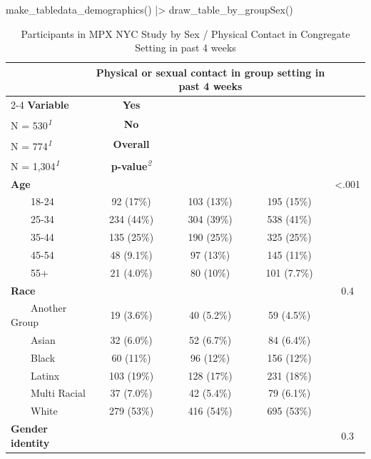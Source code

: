 \documentclass[
  letterpaper,
  DIV=11,
  numbers=noendperiod,
  oneside]{scrreprt}
\newenvironment{Shaded}{\begin{snugshade}}{\end{snugshade}}
\newcommand{\FunctionTok}[1]{\textcolor[rgb]{0.28,0.35,0.67}{#1}}
\newcommand{\NormalTok}[1]{\textcolor[rgb]{0.00,0.23,0.31}{#1}}
\newcommand{\SpecialCharTok}[1]{\textcolor[rgb]{0.37,0.37,0.37}{#1}}
\begin{document}
\begin{Shaded}
\begin{Highlighting}[]
\FunctionTok{make\_tabledata\_demographics}\NormalTok{() }\SpecialCharTok{|\textgreater{}}
  \FunctionTok{draw\_table\_by\_groupSex}\NormalTok{()}
\end{Highlighting}
\end{Shaded}

\hypertarget{tbl-demographics}{}
\setlength{\LTpost}{0mm}
\begin{longtable}{lcccc}
\caption{\label{tbl-demographics}Participants in MPX NYC Study by Sex / Physical Contact in Congregate
Setting in past 4 weeks }\tabularnewline

\toprule
 & \multicolumn{3}{c}{\textbf{Physical or sexual contact in group setting in past 4 weeks}} &  \\ 
\cmidrule(lr){2-4}
\textbf{Variable} & \textbf{Yes}\\
N = 530\textsuperscript{\textit{1}} & \textbf{No}\\
N = 774\textsuperscript{\textit{1}} & \textbf{Overall}\\
N = 1,304\textsuperscript{\textit{1}} & \textbf{p-value}\textsuperscript{\textit{2}} \\ 
\midrule\addlinespace[2.5pt]
\textbf{Age} &  &  &  & <.001 \\ 
    18-24 & 92 (17\%) & 103 (13\%) & 195 (15\%) &  \\ 
    25-34 & 234 (44\%) & 304 (39\%) & 538 (41\%) &  \\ 
    35-44 & 135 (25\%) & 190 (25\%) & 325 (25\%) &  \\ 
    45-54 & 48 (9.1\%) & 97 (13\%) & 145 (11\%) &  \\ 
    55+ & 21 (4.0\%) & 80 (10\%) & 101 (7.7\%) &  \\ 
\textbf{Race} &  &  &  & 0.4 \\ 
    Another Group & 19 (3.6\%) & 40 (5.2\%) & 59 (4.5\%) &  \\ 
    Asian & 32 (6.0\%) & 52 (6.7\%) & 84 (6.4\%) &  \\ 
    Black & 60 (11\%) & 96 (12\%) & 156 (12\%) &  \\ 
    Latinx & 103 (19\%) & 128 (17\%) & 231 (18\%) &  \\ 
    Multi Racial & 37 (7.0\%) & 42 (5.4\%) & 79 (6.1\%) &  \\ 
    White & 279 (53\%) & 416 (54\%) & 695 (53\%) &  \\ 
\textbf{Gender identity} &  &  &  & 0.3 \\ 

\end{longtable}
\end{document}
